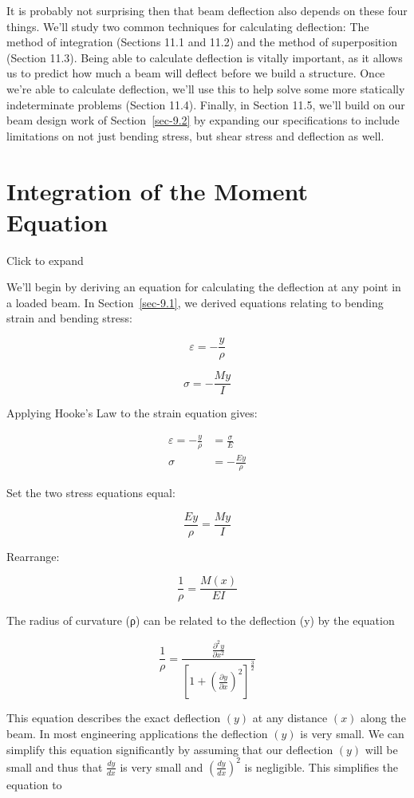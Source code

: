 \documentclass[
  letterpaper,
  DIV=11,
  numbers=noendperiod]{scrreprt}
\theoremstyle{definition}
\theoremstyle{remark}
\begin{document}
It is probably not surprising then that beam deflection also depends on
these four things. We'll study two common techniques for calculating
deflection: The method of integration (Sections 11.1 and 11.2) and the
method of superposition (Section 11.3). Being able to calculate
deflection is vitally important, as it allows us to predict how much a
beam will deflect before we build a structure. Once we're able to
calculate deflection, we'll use this to help solve some more statically
indeterminate problems (Section 11.4). Finally, in Section 11.5, we'll
build on our beam design work of Section~\ref{sec-9.2} by expanding our
specifications to include limitations on not just bending stress, but
shear stress and deflection as well.

\section{Integration of the Moment Equation}\label{sec-11.1}

Click to expand

We'll begin by deriving an equation for calculating the deflection at
any point in a loaded beam. In Section~\ref{sec-9.1}, we derived
equations relating to bending strain and bending stress:

\[
\varepsilon=-\frac{y}{\rho}
\]

\[
\sigma=-\frac{My}{I}
\]

Applying Hooke's Law to the strain equation gives:

\[
\begin{aligned}
\varepsilon=-\frac{y}{\rho}&=\frac{\sigma}{E} \\
\sigma&=-\frac{Ey}{\rho}
\end{aligned}
\]

Set the two stress equations equal:

\[
\frac{E y}{\rho}=\frac{M y}{I}
\]

Rearrange:

\[
\frac{1}{\rho}=\frac{M(x)}{E I}
\]

The radius of curvature (ρ) can be related to the deflection (y) by the
equation

\[
\frac{1}{\rho}=\frac{\frac{\partial^{2} y}{\partial x^{2}}}{\left[1+\left(\frac{\partial y}{\partial x}\right)^{2}\right]^{\frac{3}{2}}}
\]

This equation describes the exact deflection \((y)\) at any distance
\((x)\) along the beam. In most engineering applications the deflection
\((y)\) is very small. We can simplify this equation significantly by
assuming that our deflection \((y)\) will be small and thus that
\(\frac{d y}{d x}\) is very small and
\(\left(\frac{d y}{d x}\right)^{2}\) is negligible. This simplifies the
equation to
\end{document}
